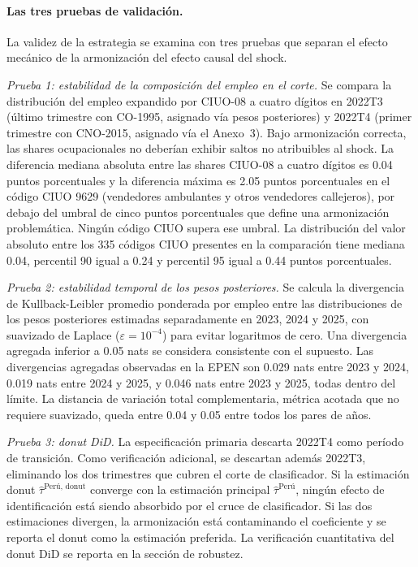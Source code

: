 \paragraph{Las tres pruebas de validaci\'{o}n.} La validez de la estrategia se examina con tres pruebas que separan el efecto mec\'{a}nico de la armonizaci\'{o}n del efecto causal del shock.

\emph{Prueba 1: estabilidad de la composici\'{o}n del empleo en el corte.} Se compara la distribuci\'{o}n del empleo expandido por CIUO-08 a cuatro d\'{i}gitos en 2022T3 (\'{u}ltimo trimestre con CO-1995, asignado v\'{i}a pesos posteriores) y 2022T4 (primer trimestre con CNO-2015, asignado v\'{i}a el Anexo~3). Bajo armonizaci\'{o}n correcta, las shares ocupacionales no deber\'{i}an exhibir saltos no atribuibles al shock. La diferencia mediana absoluta entre las shares CIUO-08 a cuatro d\'{i}gitos es 0.04 puntos porcentuales y la diferencia m\'{a}xima es 2.05 puntos porcentuales en el c\'{o}digo CIUO 9629 (vendedores ambulantes y otros vendedores callejeros), por debajo del umbral de cinco puntos porcentuales que define una armonizaci\'{o}n problem\'{a}tica. Ning\'{u}n c\'{o}digo CIUO supera ese umbral. La distribuci\'{o}n del valor absoluto entre los 335 c\'{o}digos CIUO presentes en la comparaci\'{o}n tiene mediana 0.04, percentil 90 igual a 0.24 y percentil 95 igual a 0.44 puntos porcentuales.

\emph{Prueba 2: estabilidad temporal de los pesos posteriores.} Se calcula la divergencia de Kullback-Leibler promedio ponderada por empleo entre las distribuciones de los pesos posteriores estimadas separadamente en 2023, 2024 y 2025, con suavizado de Laplace ($\varepsilon = 10^{-4}$) para evitar logaritmos de cero. Una divergencia agregada inferior a 0.05 nats se considera consistente con el supuesto. Las divergencias agregadas observadas en la EPEN son 0.029 nats entre 2023 y 2024, 0.019 nats entre 2024 y 2025, y 0.046 nats entre 2023 y 2025, todas dentro del l\'{i}mite. La distancia de variaci\'{o}n total complementaria, m\'{e}trica acotada que no requiere suavizado, queda entre 0.04 y 0.05 entre todos los pares de a\~{n}os.

\emph{Prueba 3: donut DiD.} La especificaci\'{o}n primaria descarta 2022T4 como per\'{i}odo de transici\'{o}n. Como verificaci\'{o}n adicional, se descartan adem\'{a}s 2022T3, eliminando los dos trimestres que cubren el corte de clasificador. Si la estimaci\'{o}n donut $\hat\tau^{\text{Per\'{u}, donut}}$ converge con la estimaci\'{o}n principal $\hat\tau^{\text{Per\'{u}}}$, ning\'{u}n efecto de identificaci\'{o}n est\'{a} siendo absorbido por el cruce de clasificador. Si las dos estimaciones divergen, la armonizaci\'{o}n est\'{a} contaminando el coeficiente y se reporta el donut como la estimaci\'{o}n preferida. La verificaci\'{o}n cuantitativa del donut DiD se reporta en la secci\'{o}n de robustez.

